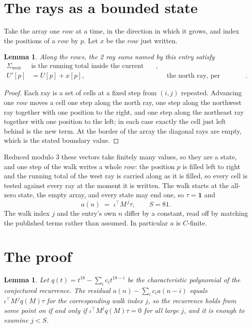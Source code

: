 \documentclass[11pt,a4paper]{article}
\theoremstyle{plain}
\newtheorem{lemma}[theorem]{Lemma}
\theoremstyle{definition}
\begin{document}
\section{The rays as a bounded state}

Take the array one $row$ at a time, in the direction in which it grows, and index the
positions of a $row $ by $p$. Let $x$ be the $row$ just written.

\begin{lemma}\label{lem:rays}
Along the $row$s, the 2 ray sums named by this entry satisfy
\[
\begin{aligned}
\Sigma_{\mathrm{west}}\ &\text{is the running total inside the current row},\\
U'[p]&=U[p]+x[p], &&\text{the north ray, per position} .
\end{aligned}
\]
\end{lemma}

\begin{proof}
Each ray is a set of cells at a fixed step from $(i,j)$ repeated. Advancing one $row$
moves a cell one step along the north ray, one step along the northwest ray together with one
position to the right, and one step along the northeast ray together with one position to the
left; in each case exactly the cell just left behind is the new term. At the border of the
array the diagonal rays are empty, which is the stated boundary value.
\end{proof}

Reduced modulo $3$ these vectors take finitely many values, so they are a state, and one step
of the walk writes a whole $row$: the position $p$ is filled left to right and the
running total of the west ray is carried along as it is filled, so every cell is tested
against every ray at the moment it is written. The walk starts at the all-zero state, the empty
array, and every state may end one, so $\tau=\mathbf{1}$ and
\[
a(n)\;=\;\iota^{\!\top}M^{\,j}\tau ,\qquad S=81.
\]
The walk index $j$ and the entry's own $n$ differ by a constant, read off by matching the
published terms rather than assumed. In particular $a$ is $C$-finite.

\section{The proof}

\begin{lemma}\label{lem:crit}
Let $q(t)=t^{18}-\sum_i c_it^{18-i}$ be the characteristic polynomial of the
conjectured recurrence. The residual $a(n)-\sum_ic_ia(n-i)$ equals
$\iota^{\!\top}M^{\,j}q(M)\tau$ for the corresponding walk index $j$, so the recurrence
holds from some point on if and only if $\iota^{\!\top}M^{j}q(M)\tau=0$ for all large $j$,
and it is enough to examine $j<S$.
\end{lemma}
\end{document}
